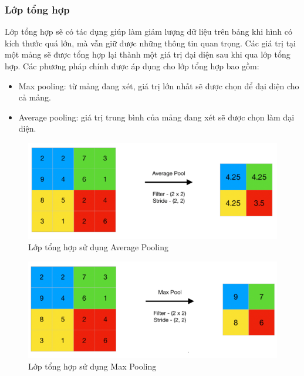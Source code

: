\subsubsection*{Lớp tổng hợp}
Lớp tổng hợp sẽ có tác dụng giúp làm giảm lượng dữ liệu trên bảng khi hình có kích thước quá lớn, mà vẫn giữ được những thông tin quan trọng. Các giá trị tại một mảng sẽ được tổng hợp lại thành một giá trị đại diện sau khi qua lớp tổng hợp. Các phương pháp chính được áp dụng cho lớp tổng hợp bao gồm:
\begin{itemize}
  \item Max pooling: từ mảng đang xét, giá trị lớn nhất sẽ được chọn để đại diện cho cả mảng.
  \item Average pooling: giá trị trung bình của mảng đang xét sẽ được chọn làm đại diện.
\end{itemize}
\begin{figure}[H]
  \centering
  \includegraphics[scale=0.7]{pics/Chapter3/avgpool.png}
  \caption{Lớp tổng hợp sử dụng Average Pooling \cite{poolingg4g}}
  \label{fig:enter-label}
\end{figure}
\begin{figure}[H]
  \centering
  \includegraphics[scale=0.7]{pics/Chapter3/maxpool.png}
  \caption{Lớp tổng hợp sử dụng Max Pooling  \cite{poolingg4g}}
  \label{fig:enter-label}
\end{figure}
